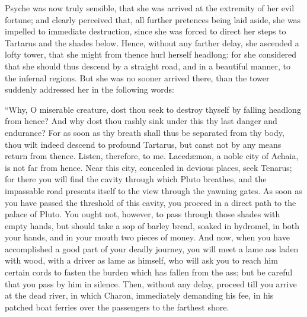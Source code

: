 \documentclass{article}
\begin{document}
Psyche was now truly sensible, that she was arrived at the extremity of her
evil fortune; and clearly perceived that, all further pretences being laid
aside, she was impelled to immediate destruction, since she was forced to
direct her steps to Tartarus and the shades below. Hence, without any farther
delay, she ascended a lofty tower, that she might from thence hurl herself
headlong: for she considered that she should thus descend by a straight road,
and in a beautiful manner, to the infernal regions. But she was no sooner
arrived there, than the tower suddenly addressed her in the following words:

``Why, O miserable creature, dost thou seek to destroy thyself by falling
headlong from hence? And why dost thou rashly sink under this thy last danger
and endurance? For as soon as thy breath shall thus be separated from thy body,
thou wilt indeed descend to profound Tartarus, but canst not by any means
return from thence. Listen, therefore, to me. Laced{\ae}mon, a noble city of
Achaia, is not far from hence. Near this city, concealed in devious places,
seek Tenarus; for there you will find the cavity through which Pluto breathes,
and the impassable road presents itself to the view through the yawning gates.
As soon as you have passed the threshold of this cavity, you proceed in a
direct path to the palace of Pluto. You ought not, however, to pass through
those shades with empty hands, but should take a sop of barley bread, soaked in
hydromel, in both your hands, and in your mouth two pieces of money. And now,
when you have accomplished a good part of your deadly journey, you will meet a
lame ass laden with wood, with a driver as lame as himself, who will ask you to
reach him certain cords to fasten the burden which has fallen from the ass; but
be careful that you pass by him in silence. Then, without any delay, proceed
till you arrive at the dead river, in which Charon, immediately demanding his
fee, in his patched boat ferries over the passengers to the farthest shore.
\end{document}
